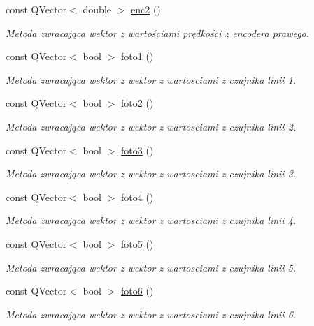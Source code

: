 \begin{DoxyCompactItemize}
const Q\+Vector$<$ double $>$ \hyperlink{class_data_acd4ce60711460e5b4507044759c0809f}{enc2} ()
\begin{DoxyCompactList}\small\item\em Metoda zwracająca wektor z wartościami prędkości z encodera prawego. \end{DoxyCompactList}\item 
const Q\+Vector$<$ bool $>$ \hyperlink{class_data_a0623960406bcd9b88cbc2272ec25e244}{foto1} ()
\begin{DoxyCompactList}\small\item\em Metoda zwracająca wektor z wektor z wartosciami z czujnika linii 1. \end{DoxyCompactList}\item 
const Q\+Vector$<$ bool $>$ \hyperlink{class_data_a5a7a46eec7a6e0e4f0b002e9a1672ddb}{foto2} ()
\begin{DoxyCompactList}\small\item\em Metoda zwracająca wektor z wektor z wartosciami z czujnika linii 2. \end{DoxyCompactList}\item 
const Q\+Vector$<$ bool $>$ \hyperlink{class_data_a52a7d60591610ce2b56f8e4245df150b}{foto3} ()
\begin{DoxyCompactList}\small\item\em Metoda zwracająca wektor z wektor z wartosciami z czujnika linii 3. \end{DoxyCompactList}\item 
const Q\+Vector$<$ bool $>$ \hyperlink{class_data_a3d816a143f8e994ffe69732c13d77c6c}{foto4} ()
\begin{DoxyCompactList}\small\item\em Metoda zwracająca wektor z wektor z wartosciami z czujnika linii 4. \end{DoxyCompactList}\item 
const Q\+Vector$<$ bool $>$ \hyperlink{class_data_a8618202cb647da7a124917ac95797e63}{foto5} ()
\begin{DoxyCompactList}\small\item\em Metoda zwracająca wektor z wektor z wartosciami z czujnika linii 5. \end{DoxyCompactList}\item 
const Q\+Vector$<$ bool $>$ \hyperlink{class_data_a1c5c32ab81b669a34b8aa494debe0ec9}{foto6} ()
\begin{DoxyCompactList}\small\item\em Metoda zwracająca wektor z wektor z wartosciami z czujnika linii 6. \end{DoxyCompactList}\item 

\end{DoxyCompactItemize}
